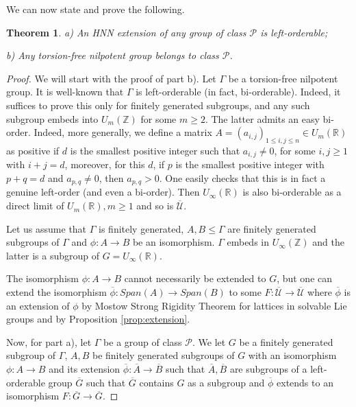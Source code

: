 \documentclass[12pt]{amsart}
\newtheorem{thm}{Theorem}[section]
\theoremstyle{definition}
\begin{document}
\medskip 
    
    We can now state and prove the following.
    
    \begin{thm} \label{thm:nilpotent} a) An HNN extension of any group of class $\mathcal{P}$ is left-orderable; 
    
     b) Any torsion-free nilpotent group belongs to class $\mathcal{P}$.
    \end{thm}
    
    \medskip
    
    \begin{proof} We will start with the proof of part b). Let $\Gamma $ be a torsion-free nilpotent group. It is well-known that $\Gamma $ is left-orderable (in fact, bi-orderable). Indeed, it suffices to prove this only for finitely generated subgroups, and any such subgroup embeds into $U_m(\mathbb{Z})$ for some $m\geq 2$. The latter admits an easy bi-order. Indeed, more generally, we define a matrix $A = (a_{i,j})_{1\leq i, j\leq n}\in U_m(\mathbb{R})$ as positive if $d$ is the smallest positive integer such that $a_{i,j} \neq 0$, for some $i, j\geq 1$ with $i+j = d$, moreover, for this $d$, if $p$ is the smallest positive integer with $p+q = d$ and $a_{p,q}\neq 0$, then $a_{p,q} > 0$. One easily checks that this is in fact a genuine left-order (and even a bi-order). Then $U_{\infty }(\mathbb{R})$ is also bi-orderable as a direct limit of $U_{m}(\mathbb{R}), m\geq 1$ and so is $\overline{\mathcal{U}}$.
    
    \medskip
    
    Let us assume that $\Gamma $ is finitely generated, $A, B\leq \Gamma $ are finitely generated subgroups of $\Gamma $ and $\phi :A\to B$ be an isomorphism. $\Gamma $ embeds in $U_{\infty }(\mathbb{Z})$ and the latter is a subgroup of $G = U_{\infty }(\mathbb{R})$. 
    
    \medskip
    
    The isomorphism $\phi :A\to B$ cannot necessarily be extended to $G$, but one can extend the isomorphism $\overline {\phi }:Span(A)\to Span(B)$ to some $F:\overline{\mathcal{U}}\to \overline{\mathcal{U}}$ where $\overline {\phi }$ is an extension of $\phi $ by Mostow Strong Rigidity Theorem for lattices in solvable Lie groups \cite{R} and by Proposition \ref{prop:extension}.
    
    \medskip 

    Now, for part a), let $\Gamma $ be a group of class $\mathcal{P}$. We let $G$ be a finitely generated subgroup of $\Gamma $, $A, B$ be finitely generated subgroups of $G$ with an isomorphism $\phi:A\to B$ and its extension $\overline{\phi }:\overline{A}\to \overline{B}$ such that $\overline{A}, \overline{B}$ are subgroups of a left-orderable group $\overline{G}$ such that $\overline{G}$ contains $G$ as a subgroup and $\overline{\phi }$ extends to an isomorphism $F:\overline{G}\to \overline{G}$. 


\end{proof}
\end{document}
